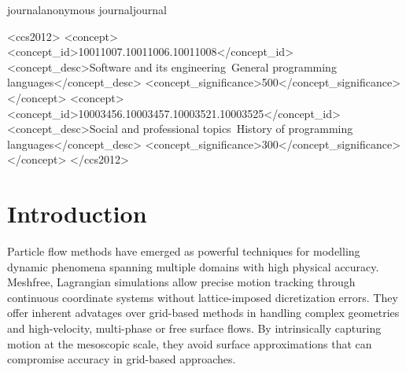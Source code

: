 \documentclass[review, anonymous, acmsmall]{acmart}
\def\acmversionanonymous{anonymous}
\def\acmversionjournal{journal}
\def\acmversion{anonymous}
\def\acmversion{journal}
\begin{document}
\ifx\acmversion\acmversionanonymous
{} %
\renewcommand\footnotetextcopyrightpermission[1]{} %
\fi
\ifx\acmversion\acmversionjournal
\begin{CCSXML}
<ccs2012>
<concept>
<concept_id>10011007.10011006.10011008</concept_id>
<concept_desc>Software and its engineering~General programming languages</concept_desc>
<concept_significance>500</concept_significance>
</concept>
<concept>
<concept_id>10003456.10003457.10003521.10003525</concept_id>
<concept_desc>Social and professional topics~History of programming languages</concept_desc>
<concept_significance>300</concept_significance>
</concept>
</ccs2012>
\end{CCSXML}


\fi

\maketitle

\section{Introduction}
Particle flow methods have emerged as powerful techniques for modelling dynamic phenomena spanning multiple domains with high physical accuracy.
Meshfree, Lagrangian simulations allow precise motion tracking through continuous coordinate systems without lattice-imposed dicretization errors.
They offer inherent advatages over grid-based methods in handling complex geometries and high-velocity, multi-phase or free surface flows.
By intrinsically capturing motion at the mesoscopic scale, they avoid surface approximations that can compromise accuracy in grid-based approaches.
\end{document}
